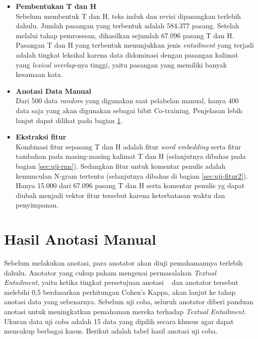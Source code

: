 \begin{itemize}
	\item\textbf{Pembentukan T dan H} \\
	Sebelum membentuk T dan H, teks induk dan revisi dipasangkan terlebih dahulu. Jumlah pasangan yang terbentuk adalah 584.377 pasang. Setelah melalui tahap pemrosesan, dihasilkan sejumlah 67.096 pasang T dan H. Pasangan T dan H yang terbentuk menunjukkan jenis \textit{entailment} yang terjadi adalah tingkat leksikal karena data didominasi dengan pasangan kalimat yang \textit{lexical overlap}-nya tinggi, yaitu pasangan yang memiliki banyak kesamaan kata. 
	
	\item \textbf{Anotasi Data Manual} \\
	Dari 500 data \textit{random} yang digunakan saat pelabelan manual, hanya 400 data saja yang akan digunakan sebagai bibit Co-training.  Penjelasan lebih lanjut dapat dilihat pada bagian \ref{sec:anotasi-manual}.
	
	\item \textbf{Ekstraksi fitur} \\
	Kombinasi fitur sepasang T dan H adalah fitur \textit{word embedding} serta fitur tambahan pada masing-masing kalimat T dan H (selanjutnya dibahas pada bagian \ref{sec:uji-rnn}). Sedangkan fitur untuk komentar penulis adalah kemunculan N-gram tertentu (selanjutnya dibahas di bagian \ref{sec:uji-fitur2}). Hanya 15.000 dari 67.096 pasang T dan H serta komentar penulis yg dapat diubah menjadi vektor fitur tersebut karena keterbatasan waktu dan penyimpanan. 
\end{itemize}

\section{Hasil Anotasi Manual} \label{sec:anotasi-manual}
Sebelum melakukan anotasi, para anotator akan diuji pemahamannya terlebih dahulu. Anotator yang cukup paham mengenai permasalahan \textit{Textual Entailment}, yaitu ketika tingkat persetujuan anotasi \saya~ dan anotator tersebut melebihi 0,5 berdasarkan perhitungan Cohen's Kappa, akan lanjut ke tahap anotasi data yang sebenarnya. Sebelum uji coba, seluruh anotator diberi panduan anotasi untuk meningkatkan pemahaman mereka terhadap \textit{Textual Entailment}. Ukuran data uji coba adalah 15 data yang dipilih secara khusus agar dapat mencakup berbagai kasus. Berikut adalah tabel hasil anotasi uji coba.

